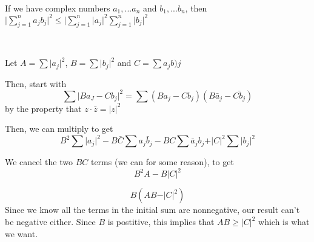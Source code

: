 \documentclass{article}
\begin{document}
\begin{theorem}
\

If we have complex numbers $a_1, ... a_n$ and $b_1, ... b_n$, then $\vert \sum_{j=1}^n a_jb_j \vert^2 \leq \vert  \sum_{j=1}^n \vert a_j\vert^2 \sum_{j=1}^n \vert b_j\vert^2$
\end{theorem}

\begin{customproof}
\

Let $A = \sum \vert a_j \vert^2$, $B = \sum \vert b_j \vert^2$ and $C = \sum a_jb)j$

Then, start with $$\sum \vert Ba_J - Cb_j \vert^2 = \sum (Ba_j - Cb_j)(B\bar{a}_j - \bar{Cb_j})$$by the property that $z \cdot \bar{z} = \vert z \vert^2$

Then, we can multiply to get $$B^2 \sum \vert a_j \vert ^2 - B\bar{C} \sum a_j \bar{b}_j - BC\sum \bar{a}_j b_j + \vert C \vert^2 \sum \vert b_j \vert^2$$

We cancel the two $BC$ terms (we can for some reason), to get $$B^2A - B \vert C \vert^2$$

$$B(AB- \vert C\vert^2)$$Since we know all the terms in the initial sum are nonnegative, our result can't be negative either. Since $B$ is postitive, this implies that $AB \geq \vert C \vert^2$ which is what we want.
\end{customproof}
\end{document}
